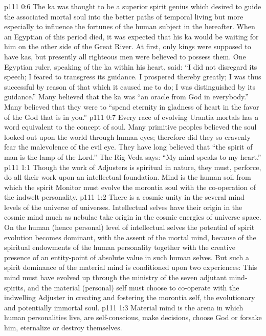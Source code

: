 \vs p111 0:6 The ka was thought to be a superior spirit genius which desired to guide the associated mortal soul into the better paths of temporal living but more especially to influence the fortunes of the human subject in the hereafter. When an Egyptian of this period died, it was expected that his ka would be waiting for him on the other side of the Great River. At first, only kings were supposed to have kas, but presently all righteous men were believed to possess them. One Egyptian ruler, speaking of the ka within his heart, said: “I did not disregard its speech; I feared to transgress its guidance. I prospered thereby greatly; I was thus successful by reason of that which it caused me to do; I was distinguished by its guidance.” Many believed that the ka was “an oracle from God in everybody.” Many believed that they were to “spend eternity in gladness of heart in the favor of the God that is in you.”
\vs p111 0:7 Every race of evolving Urantia mortals has a word equivalent to the concept of soul. Many primitive peoples believed the soul looked out upon the world through human eyes; therefore did they so cravenly fear the malevolence of the evil eye. They have long believed that “the spirit of man is the lamp of the Lord.” The Rig\hyp{}Veda says: “My mind speaks to my heart.”
\vs p111 1:1 Though the work of Adjusters is spiritual in nature, they must, perforce, do all their work upon an intellectual foundation. Mind is the human soil from which the spirit Monitor must evolve the morontia soul with the co\hyp{}operation of the indwelt personality.
\vs p111 1:2 There is a cosmic unity in the several mind levels of the universe of universes. Intellectual selves have their origin in the cosmic mind much as nebulae take origin in the cosmic energies of universe space. On the human (hence personal) level of intellectual selves the potential of spirit evolution becomes dominant, with the assent of the mortal mind, because of the spiritual endowments of the human personality together with the creative presence of an entity\hyp{}point of absolute value in such human selves. But such a spirit dominance of the material mind is conditioned upon two experiences: This mind must have evolved up through the ministry of the seven adjutant mind\hyp{}spirits, and the material (personal) self must choose to co\hyp{}operate with the indwelling Adjuster in creating and fostering the morontia self, the evolutionary and potentially immortal soul.
\vs p111 1:3 \pc Material mind is the arena in which human personalities live, are self\hyp{}conscious, make decisions, choose God or forsake him, eternalize or destroy themselves.
